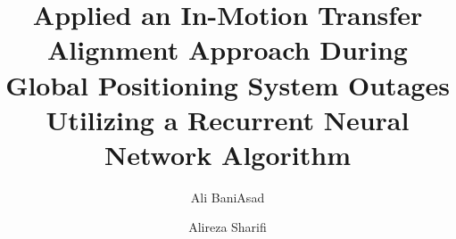 \documentclass[3p]{elsarticle}
\begin{document}
 \begin{frontmatter}
%
\title{Applied an In-Motion Transfer Alignment Approach
During Global Positioning System Outages Utilizing a
Recurrent Neural Network Algorithm}


{
\author{Ali BaniAsad}
\author{Alireza Sharifi }

 \address{Department of Aerospace Engineering
 Sharif University of Technology Tehran, Iran}
 }{}







%
%




\end{frontmatter}
\end{document}
